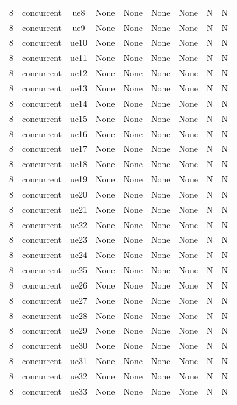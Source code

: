 \begin{table}[ht]
\begin{tabular}{|c|c|c|c|c|c|c|c|c|}
8 & concurrent & ue8 & None & None & None & None & N & N \\
8 & concurrent & ue9 & None & None & None & None & N & N \\
8 & concurrent & ue10 & None & None & None & None & N & N \\
8 & concurrent & ue11 & None & None & None & None & N & N \\
8 & concurrent & ue12 & None & None & None & None & N & N \\
8 & concurrent & ue13 & None & None & None & None & N & N \\
8 & concurrent & ue14 & None & None & None & None & N & N \\
8 & concurrent & ue15 & None & None & None & None & N & N \\
8 & concurrent & ue16 & None & None & None & None & N & N \\
8 & concurrent & ue17 & None & None & None & None & N & N \\
8 & concurrent & ue18 & None & None & None & None & N & N \\
8 & concurrent & ue19 & None & None & None & None & N & N \\
8 & concurrent & ue20 & None & None & None & None & N & N \\
8 & concurrent & ue21 & None & None & None & None & N & N \\
8 & concurrent & ue22 & None & None & None & None & N & N \\
8 & concurrent & ue23 & None & None & None & None & N & N \\
8 & concurrent & ue24 & None & None & None & None & N & N \\
8 & concurrent & ue25 & None & None & None & None & N & N \\
8 & concurrent & ue26 & None & None & None & None & N & N \\
8 & concurrent & ue27 & None & None & None & None & N & N \\
8 & concurrent & ue28 & None & None & None & None & N & N \\
8 & concurrent & ue29 & None & None & None & None & N & N \\
8 & concurrent & ue30 & None & None & None & None & N & N \\
8 & concurrent & ue31 & None & None & None & None & N & N \\
8 & concurrent & ue32 & None & None & None & None & N & N \\
8 & concurrent & ue33 & None & None & None & None & N & N \\

\end{tabular}
\end{table}
